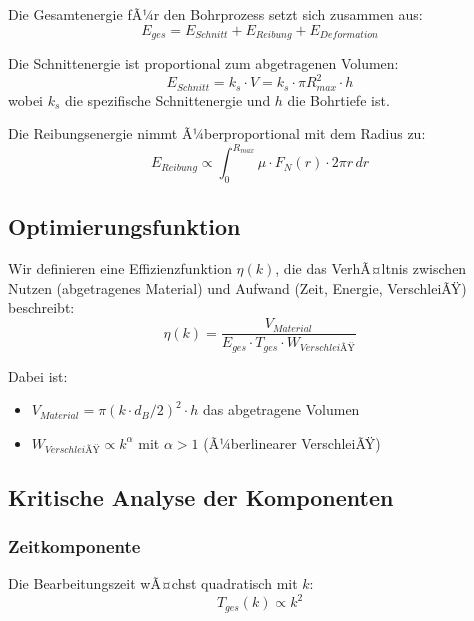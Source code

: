 ﻿\documentclass[12pt,a4paper]{article}
\begin{document}
Die Gesamtenergie fÃ¼r den Bohrprozess setzt sich zusammen aus:
\begin{equation}
	E_{ges} = E_{Schnitt} + E_{Reibung} + E_{Deformation}
\end{equation}

Die Schnittenergie ist proportional zum abgetragenen Volumen:
\begin{equation}
	E_{Schnitt} = k_s \cdot V = k_s \cdot \pi R_{max}^2 \cdot h
\end{equation}
wobei $k_s$ die spezifische Schnittenergie und $h$ die Bohrtiefe ist.

Die Reibungsenergie nimmt Ã¼berproportional mit dem Radius zu:
\begin{equation}
	E_{Reibung} \propto \int_0^{R_{max}} \mu \cdot F_N(r) \cdot 2\pi r \, dr
\end{equation}

\subsection{Optimierungsfunktion}

Wir definieren eine Effizienzfunktion $\eta(k)$, die das VerhÃ¤ltnis zwischen Nutzen (abgetragenes Material) und Aufwand (Zeit, Energie, VerschleiÃŸ) beschreibt:
\begin{equation}
	\eta(k) = \frac{V_{Material}}{E_{ges} \cdot T_{ges} \cdot W_{VerschleiÃŸ}}
\end{equation}

Dabei ist:
\begin{itemize}
	\item $V_{Material} = \pi (k \cdot d_B/2)^2 \cdot h$ das abgetragene Volumen
	\item $W_{VerschleiÃŸ} \propto k^{\alpha}$ mit $\alpha > 1$ (Ã¼berlinearer VerschleiÃŸ)
\end{itemize}

\subsection{Kritische Analyse der Komponenten}

\subsubsection{Zeitkomponente}

Die Bearbeitungszeit wÃ¤chst quadratisch mit $k$:
\begin{equation}
	T_{ges}(k) \propto k^2
\end{equation}
\end{document}
